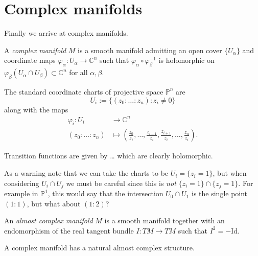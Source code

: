 \documentclass{book}
\begin{document}
\section{Complex manifolds}
\label{section-complex-manifolds}

\noindent
Finally we arrive at complex manifolds.

\begin{definition}
\label{definition-complex-manifold}
A {\it complex manifold} $M$ is a smooth
manifold admitting an open cover
$\{U_\alpha\}$ and coordinate maps
$\varphi_\alpha:U_\alpha\to\mathbb{C}^n$ such
that $\varphi_\alpha\circ\varphi_\beta^{-1}$
is holomorphic on
$\varphi_\beta(U_\alpha\cap
U_\beta)\subset\mathbb{C}^n$ for all
$\alpha,\beta$.
\end{definition}

\begin{example}
\label{example-projective-space}
The standard coordinate charts of projective
space
$\mathbb{P}^n$ are
$$
U_i:=\{(z_0:…:z_n): z_i \neq 0\}
$$
along with the maps
$$
\begin{aligned}
\varphi_i: U_i &\longrightarrow \mathbb{C}^n
\\
(z_0:…:z_n) &\longmapsto
\left(\frac{z_0}{z_i},…,\frac{z_{i-1}}{z_i},
\frac{z_{i+1}}{z_i},…,\frac{z_n}{z_i}\right).
\end{aligned}
$$

\noindent
Transition functions are given by … which are
clearly holomorphic.
\end{example}

\noindent
As a warning note that we can take the charts
to be
$U_i=\{z_i=1\}$,
but when considering $U_i \cap U_j$
we must be careful since this is {\it not}
$\{z_i=1\}\cap \{z_j=1\}$.
For example in $\mathbb{P}^1$, this would say
that the intersection
$U_0 \cap U_1$
is the single point $(1:1)$, but what about
$(1:2)$?

\begin{definition}
\label{definition-almost-complex-manifold}
An {\it almost complex manifold} $M$ is a
smooth manifold together with
an endomorphism of the real tangent bundle
$I:TM \to TM$
such that $I^2=-\text{Id}$.
\end{definition}

\begin{proposition}
\label{proposition-complex-structure}
A complex manifold has a natural almost
complex structure.
\end{proposition}
\end{document}

